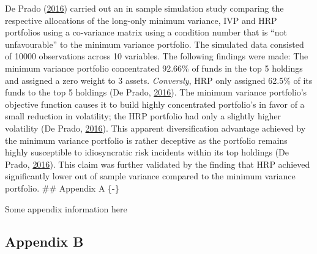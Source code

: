 \documentclass[11pt,preprint, authoryear]{elsarticle}
\numberwithin{equation}{section}
\numberwithin{figure}{section}
\numberwithin{table}{section}
\begin{document}
De Prado (\protect\hyperlink{ref-lopez}{2016}) carried out an in sample
simulation study comparing the respective allocations of the long-only
minimum variance, IVP and HRP portfolios using a co-variance matrix
using a condition number that is ``not unfavourable'' to the minimum
variance portfolio. The simulated data consisted of 10000 observations
across 10 variables. The following findings were made: The minimum
variance portfolio concentrated 92.66\% of funds in the top 5 holdings
and assigned a zero weight to 3 assets. \emph{Conversly}, HRP only
assigned 62.5\% of its funds to the top 5 holdings (De Prado,
\protect\hyperlink{ref-lopez}{2016}). The minimum variance portfolio's
objective function causes it to build highly concentrated portfolio's in
favor of a small reduction in volatility; the HRP portfolio had only a
slightly higher volatility (De Prado,
\protect\hyperlink{ref-lopez}{2016}). This apparent diversification
advantage achieved by the minimum variance portfolio is rather deceptive
as the portfolio remains highly susceptible to idiosyncratic risk
incidents within its top holdings (De Prado,
\protect\hyperlink{ref-lopez}{2016}). This claim was further validated
by the finding that HRP achieved significantly lower out of sample
variance compared to the minimum variance portfolio. \#\# Appendix A
\{-\}

Some appendix information here

\hypertarget{appendix-b}{%
\subsection*{Appendix B}\label{appendix-b}}


\end{document}
